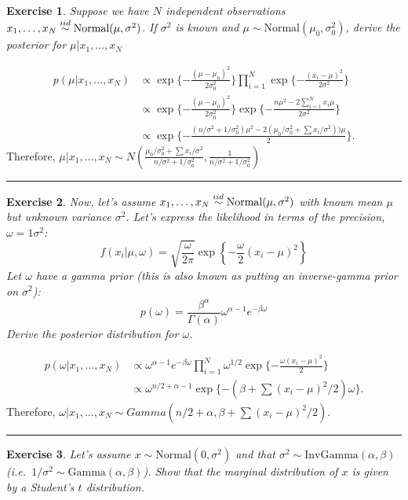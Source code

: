 \documentclass[twoside]{article}
\newcounter{lecnum}
\newtheorem{exercise}{Exercise}[lecnum]
\newenvironment{proof}{{\bf Proof:}}{\hfill\rule{2mm}{2mm}}
\begin{document}
\begin{exercise}
  Suppose we have $N$ independent observations $x_1,\dots, x_N \stackrel{\small{iid}}{\sim}\mbox{Normal}(\mu, \sigma^2)$. If $\sigma^2$ is known and $\mu\sim \mbox{Normal}(\mu_0,\sigma_0^2)$, derive the posterior for $\mu|x_1,\dots, x_N$
\end{exercise}

\begin{proof}
\begin{equation}
\begin{split}
p(\mu |x_1, ..., x_N) & \propto \exp\{-\frac{(\mu-\mu_0)^2}{2\sigma_0^2}\}\prod_{i=1}^N\exp\{-\frac{(x_i-\mu)^2}{2\sigma^2}\}\\
& \propto \exp\{-\frac{(\mu-\mu_0)^2}{2\sigma_0^2}\}\exp\{-\frac{n\mu^2-2\sum_{i=1}^N x_i\mu}{2\sigma^2}\}\\
& \propto \exp\{-\frac{(n/\sigma^2+1/\sigma_0^2)\mu^2 - 2(\mu_0/\sigma_0^2+\sum x_i/\sigma^2))\mu}{2}\}.
\end{split}
\end{equation}
Therefore, $\mu|x_1,..., x_N\sim N(\frac{\mu_0/\sigma_0^2+\sum x_i/\sigma^2}{n/\sigma^2+1/\sigma_0^2}, \frac{1}{n/\sigma^2+1/\sigma_0^2})$
\end{proof}

\begin{exercise}
  Now, let's assume  $x_1,\dots, x_N \stackrel{\small{iid}}{\sim}\mbox{Normal}(\mu, \sigma^2)$ with known mean $\mu$ but unknown variance $\sigma^2$. Let's express the likelihood in terms of the precision, $\omega=1\sigma^2$:
  $$f(x_i|\mu, \omega) = \sqrt{\frac{\omega}{2\pi}} \exp\left\{-\frac{\omega}{2}(x_i-\mu)^2\right\}$$
  Let $\omega$ have a gamma prior (this is also known as putting an inverse-gamma prior on $\sigma^2$):
  $$p(\omega) = \frac{\beta^\alpha}{\Gamma(\alpha)}\omega^{\alpha-1}e^{-\beta \omega}$$
  Derive the posterior distribution for $\omega$.
\end{exercise}

\begin{proof}
\begin{equation}
\begin{split}
p(\omega |x_1, ..., x_N) & \propto\omega^{\alpha-1}e^{-\beta\omega}\prod_{i=1}^N\omega^{1/2}\exp\{-\frac{\omega(x_i-\mu)^2}{2}\}\\
& \propto \omega^{n/2+\alpha-1}\exp\{-(\beta+\sum(x_i-\mu)^2/2)\omega\}.
\end{split}
\end{equation}
Therefore, $\omega | x_1, ..., x_N \sim Gamma(n/2 + \alpha, \beta +\sum(x_i-\mu)^2/2)$.
\end{proof}
\begin{exercise}
  Let's assume $x \sim \mbox{Normal}(0, \sigma^2)$ and that $\sigma^2\sim\mbox{InvGamma}(\alpha,\beta)$ (i.e.\ $1/\sigma^2 \sim \mbox{Gamma}(\alpha,\beta)$). Show that the marginal distribution of $x$ is given by a Student's $t$ distribution.
\end{exercise}
\end{document}
